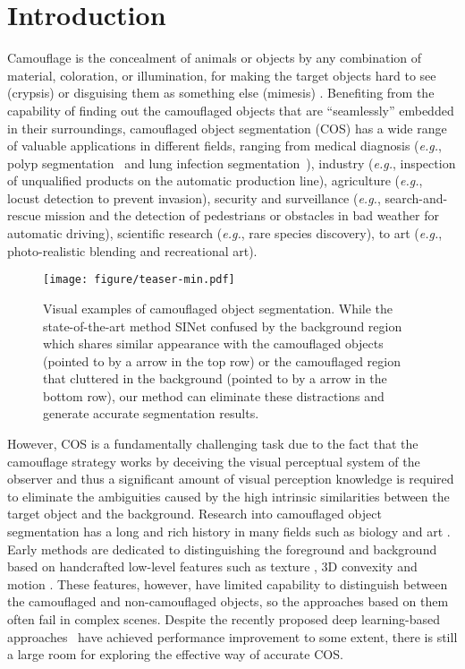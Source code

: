\documentclass[final]{cvpr}
\begin{document}
\section{Introduction}

Camouflage is the concealment of animals or objects by any combination of material, coloration, or illumination, for making the target objects hard to see (crypsis) or disguising them as something else (mimesis) \cite{stevens2009animal}. Benefiting from the capability of finding out the camouflaged objects that are ``seamlessly'' embedded in their surroundings, camouflaged object segmentation (COS) has a wide range of valuable applications in different fields, ranging from medical diagnosis (\emph{e.g.}, polyp segmentation~\cite{fan2020pra_pranet} and lung infection segmentation~\cite{fan2020inf}), industry (\emph{e.g.}, inspection of unqualified products on the automatic production line), agriculture (\emph{e.g.}, locust detection to prevent invasion), security and surveillance (\emph{e.g.}, search-and-rescue mission and the detection of pedestrians or obstacles in bad weather for automatic driving), scientific research (\emph{e.g.}, rare species discovery), to art (\emph{e.g.}, photo-realistic blending and recreational art).

\begin{figure}[tbp]
	\begin{center}
		\texttt{[image: figure/teaser-min.pdf]}
	\end{center}
\caption{Visual examples of camouflaged object segmentation. While the state-of-the-art method SINet \cite{Fan_2020_CVPR_sinet} confused by the background region which shares similar appearance with the camouflaged objects (pointed to by a arrow in the top row) or the camouflaged region that cluttered in the background (pointed to by a arrow in the bottom row), our method can eliminate these distractions and generate accurate segmentation results.}
\label{fig:teaser}
\end{figure}

However, COS is a fundamentally challenging task due to the fact that the camouflage strategy works by deceiving the visual perceptual system of the observer \cite{stevens2009animal} and thus a significant amount of visual perception knowledge \cite{troscianko2009camouflage} is required to eliminate the ambiguities caused by the high intrinsic similarities between the target object and the background.
Research into camouflaged object segmentation has a long and rich history in many fields such as biology and art \cite{stevens2009animal}. Early methods are dedicated to distinguishing the foreground and background based on handcrafted low-level features such as texture \cite{4579856}, 3D convexity \cite{pan2011study} and motion \cite{li2011detection}. These features, however, have limited capability to distinguish between the camouflaged and non-camouflaged objects, so the approaches based on them often fail in complex scenes. Despite the recently proposed deep learning-based approaches~\cite{le2019anabranch_camo,Fan_2020_CVPR_sinet,yan2020mirrornet} have achieved performance improvement to some extent, there is still a large room for exploring the effective way of accurate COS.
\end{document}
